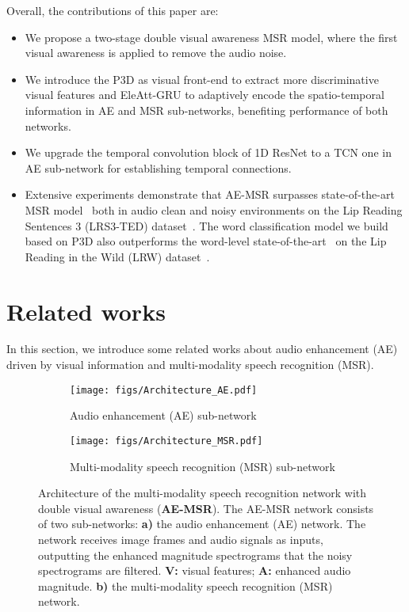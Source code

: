 \documentclass[10pt,twocolumn,letterpaper]{article}
\begin{document}
Overall, the contributions of this paper are:
\begin{itemize}
    \item We propose a two-stage double visual awareness MSR model, where the first visual awareness is applied to remove the audio noise.  
    \item We introduce the P3D as visual front-end to extract more discriminative visual features and EleAtt-GRU to adaptively encode the spatio-temporal information in AE and MSR sub-networks, benefiting performance of both networks.
    \item We upgrade the temporal convolution block of 1D ResNet to a TCN one in AE sub-network for establishing temporal connections.
    \item Extensive experiments demonstrate that AE-MSR surpasses state-of-the-art MSR model~\cite{Triantafyllos-avsr2018} both in audio clean and noisy environments on the Lip Reading Sentences 3 (LRS3-TED) dataset~\cite{afouras2018lrs3}. The word classification model we build based on P3D also outperforms the word-level state-of-the-art~\cite{stafylakis2017combining} on the Lip Reading in the Wild (LRW) dataset~\cite{chung2016lip}. 
\end{itemize}

\section{Related works}

In this section, we introduce some related works about audio enhancement (AE) driven by visual information and multi-modality speech recognition (MSR).

\begin{figure*}[t]
\centering
\begin{subfigure}[t]{6.2in}
\centering
        \texttt{[image: figs/Architecture\_AE.pdf]}
\caption{Audio enhancement (AE)
        sub-network}
\label{fig:architecture_ae}
    \end{subfigure}
    
    \begin{subfigure}[h]{6.2in}
\centering
        \texttt{[image: figs/Architecture\_MSR.pdf]}
\caption{Multi-modality speech recognition (MSR) sub-network}
        \label{fig:architecture_MSR}
    \end{subfigure}
\caption{Architecture of the multi-modality speech recognition network with double visual awareness ({\bf AE-MSR}). The AE-MSR network consists of two sub-networks: {\bf a)} the audio enhancement (AE) network. The network receives image frames and audio signals as inputs, outputting the enhanced magnitude spectrograms that the noisy spectrograms are filtered. {\bf V:} visual features; {\bf A:} enhanced audio magnitude. {\bf b)} the multi-modality speech recognition (MSR) network.}
\label{fig:architecture}
\vspace{6pt}
\end{figure*}
\end{document}
